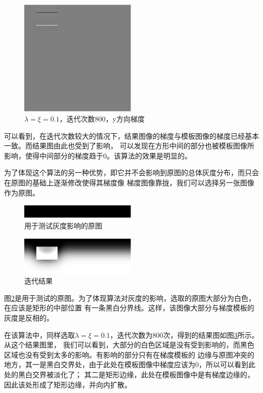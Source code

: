 \begin{figure}[h!]
\center
\includegraphics[width=0.5\textwidth]{figure/gradtest/Iouty3}
\caption{$\lambda=\xi=0.1$，迭代次数800，y方向梯度}\label{fig:Iouty3}
\end{figure}
可以看到，在迭代次数较大的情况下，结果图像的梯度与模板图像的梯度已经基本一致。而结果图由此也受到了影响，
可以发现在方形中间的部分也被模板图像所影响，使得中间部分的梯度趋于$0$。该算法的效果是明显的。

为了体现这个算法的另一种优势，即它并不会影响到原图的总体灰度分布，而只会在原图的基础上逐渐修改使得其梯度像
梯度图像靠拢，我们可以选择另一张图像作为原图。
\begin{figure}[h!]
\center
\includegraphics[width=0.5\textwidth]{figure/gradtest/I4}
\caption{用于测试灰度影响的原图}\label{fig:I4}
\end{figure}
\begin{figure}[h!]
\center
\includegraphics[width=0.5\textwidth]{figure/gradtest/Iout4}
\caption{迭代结果}\label{fig:Iout4}
\end{figure}
图\ref{fig:I4}是用于测试的原图。为了体现算法对灰度的影响，选取的原图大部分为白色，在应该是矩形的中部位置
有一条黑白分界线。这样，该图像大部分与梯度模板的灰度是反相的。

在该算法中，同样选取$\lambda=\xi=0.1$，迭代次数为$800$次，得到的结果图如图\ref{fig:Iout4}所示。从这个结果图里，
我们可以看到，大部分的白色区域是没有受到影响的，而黑色区域也没有受到太多的影响。有影响的部分只有在梯度模板的
边缘与原图冲突的地方，其一是黑白交界处，由于此处在模板图像中梯度应该为$0$，所以可以看到此处的黑白交界被淡化了；
其二是矩形边缘，此处在模板图像中是有梯度边缘的，因此该处形成了矩形边缘，并向内扩散。

